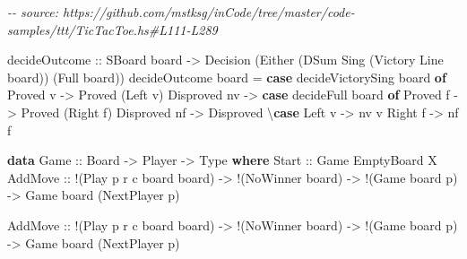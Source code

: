 \documentclass[]{article}
\newenvironment{Shaded}{}{}
\newcommand{\CommentTok}[1]{\textcolor[rgb]{0.38,0.63,0.69}{\textit{#1}}}
\newcommand{\DataTypeTok}[1]{\textcolor[rgb]{0.56,0.13,0.00}{#1}}
\newcommand{\KeywordTok}[1]{\textcolor[rgb]{0.00,0.44,0.13}{\textbf{#1}}}
\newcommand{\NormalTok}[1]{#1}
\newcommand{\OperatorTok}[1]{\textcolor[rgb]{0.40,0.40,0.40}{#1}}
\newcommand{\OtherTok}[1]{\textcolor[rgb]{0.00,0.44,0.13}{#1}}
\begin{document}
\begin{Shaded}
\begin{Highlighting}[]
\CommentTok{{-}{-} source: https://github.com/mstksg/inCode/tree/master/code{-}samples/ttt/TicTacToe.hs\#L111{-}L289}

\NormalTok{decideOutcome}
\OtherTok{    ::} \DataTypeTok{SBoard}\NormalTok{ board}
    \OtherTok{{-}\textgreater{}} \DataTypeTok{Decision}\NormalTok{ (}\DataTypeTok{Either}\NormalTok{ (}\DataTypeTok{DSum} \DataTypeTok{Sing}\NormalTok{ (}\DataTypeTok{Victory} \DataTypeTok{Line}\NormalTok{ board)) (}\DataTypeTok{Full}\NormalTok{ board))}
\NormalTok{decideOutcome board }\OtherTok{=}
    \KeywordTok{case}\NormalTok{ decideVictorySing board }\KeywordTok{of}
        \DataTypeTok{Proved}\NormalTok{ v }\OtherTok{{-}\textgreater{}} \DataTypeTok{Proved}\NormalTok{ (}\DataTypeTok{Left}\NormalTok{ v)}
        \DataTypeTok{Disproved}\NormalTok{ nv }\OtherTok{{-}\textgreater{}}
            \KeywordTok{case}\NormalTok{ decideFull board }\KeywordTok{of}
                \DataTypeTok{Proved}\NormalTok{ f }\OtherTok{{-}\textgreater{}} \DataTypeTok{Proved}\NormalTok{ (}\DataTypeTok{Right}\NormalTok{ f)}
                \DataTypeTok{Disproved}\NormalTok{ nf }\OtherTok{{-}\textgreater{}} \DataTypeTok{Disproved}\NormalTok{ \textbackslash{}}\KeywordTok{case}
                    \DataTypeTok{Left}\NormalTok{ v }\OtherTok{{-}\textgreater{}}\NormalTok{ nv v}
                    \DataTypeTok{Right}\NormalTok{ f }\OtherTok{{-}\textgreater{}}\NormalTok{ nf f}

\KeywordTok{data} \DataTypeTok{Game}\OtherTok{ ::} \DataTypeTok{Board} \OtherTok{{-}\textgreater{}} \DataTypeTok{Player} \OtherTok{{-}\textgreater{}} \DataTypeTok{Type} \KeywordTok{where}
    \DataTypeTok{Start}\OtherTok{ ::} \DataTypeTok{Game} \DataTypeTok{EmptyBoard} \DataTypeTok{X}
    \DataTypeTok{AddMove}\OtherTok{ ::} \OperatorTok{!}\NormalTok{(}\DataTypeTok{Play}\NormalTok{ p r c board board\textquotesingle{})}
            \OtherTok{{-}\textgreater{}} \OperatorTok{!}\NormalTok{(}\DataTypeTok{NoWinner}\NormalTok{ board)}
            \OtherTok{{-}\textgreater{}} \OperatorTok{!}\NormalTok{(}\DataTypeTok{Game}\NormalTok{ board p)}
            \OtherTok{{-}\textgreater{}} \DataTypeTok{Game}\NormalTok{ board\textquotesingle{} (}\DataTypeTok{NextPlayer}\NormalTok{ p)}

    \DataTypeTok{AddMove}\OtherTok{ ::} \OperatorTok{!}\NormalTok{(}\DataTypeTok{Play}\NormalTok{ p r c board board\textquotesingle{})}
            \OtherTok{{-}\textgreater{}} \OperatorTok{!}\NormalTok{(}\DataTypeTok{NoWinner}\NormalTok{ board)}
            \OtherTok{{-}\textgreater{}} \OperatorTok{!}\NormalTok{(}\DataTypeTok{Game}\NormalTok{ board p)}
            \OtherTok{{-}\textgreater{}} \DataTypeTok{Game}\NormalTok{ board\textquotesingle{} (}\DataTypeTok{NextPlayer}\NormalTok{ p)}
\end{Highlighting}
\end{Shaded}
\end{document}

